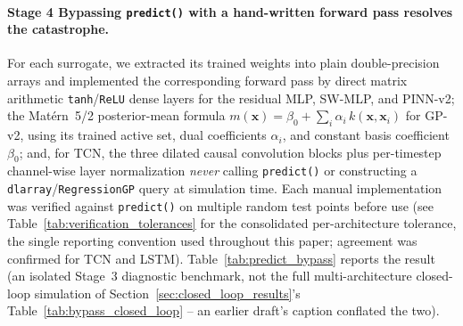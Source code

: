 \paragraph{Stage 4  Bypassing \texttt{predict()} with a hand-written
forward pass resolves the catastrophe.} For each surrogate, we
extracted its trained weights into plain double-precision arrays and
implemented the corresponding forward pass by direct matrix arithmetic
 \texttt{tanh}/\texttt{ReLU} dense layers for the residual MLP,
SW-MLP, and PINN-v2; the Mat\'ern~5/2 posterior-mean formula
$m(\mathbf{x}) = \beta_0 + \sum_i \alpha_i\, k(\mathbf{x},\mathbf{x}_i)$
for GP-v2, using its trained active set, dual coefficients $\alpha_i$,
and constant basis coefficient $\beta_0$; and, for TCN, the three
dilated causal convolution blocks plus per-timestep channel-wise layer
normalization  \emph{never} calling \texttt{predict()} or
constructing a \texttt{dlarray}/\texttt{RegressionGP} query at
simulation time. Each manual implementation was verified against
\texttt{predict()} on multiple random test points before use (see
Table~\ref{tab:verification_tolerances} for the consolidated
per-architecture tolerance, the single reporting convention used
throughout this paper; agreement was confirmed for TCN and LSTM). Table~\ref{tab:predict_bypass} reports the
result (an isolated Stage~3 diagnostic benchmark, not the full
multi-architecture closed-loop simulation of
Section~\ref{sec:closed_loop_results}'s Table~\ref{tab:bypass_closed_loop}
-- an earlier draft's caption conflated the two).

